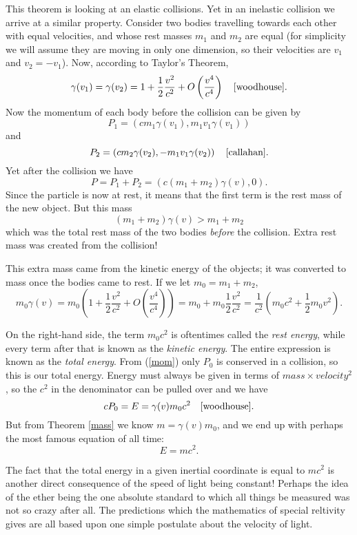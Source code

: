 \documentclass[12pt]{article}
\theoremstyle{defn}
\theoremstyle{pf}
\newcommand{\0}{\emptyset}
\renewcommand{\-}{\setminus}
\begin{document}
This theorem is looking at an elastic collisions. Yet in an inelastic collision we arrive at a similar property. Consider two bodies travelling towards each other with equal velocities, and whose rest masses $m_1$ and $m_2$ are equal (for simplicity we will assume they are moving in only one dimension, so their velocities are $v_1$ and $v_2=-v_1$). Now, according to Taylor's Theorem, $$\gamma(v_1)=\gamma(v_2)=1+\dfrac{1}{2}\dfrac{v^2}{c^2}+O\left(\dfrac{v^4}{c^4}\right)  \quad \mbox{\cite{woodhouse}}.$$ Now the momentum of each body before the collision can be given by $$P_1=\left(cm_1\gamma(v_1),m_1v_1\gamma(v_1)\right)$$ and $$P_2=\left(cm_2\gamma(v_2),-m_1v_1\gamma(v_2)\right) \quad \mbox{\cite{callahan}}.$$ Yet after the collision we have \begin{equation}\label{mom}P=P_1+P_2=\left(c(m_1+m_2)\gamma(v),0\right).\end{equation} Since the particle is now at rest, it means that the first term is the rest mass of the new object. But this mass $$(m_1+m_2)\gamma(v)>m_1+m_2$$ which was the total rest mass of the two bodies \textit{before} the collision. Extra rest mass was created from the collision! 

This extra mass came from the kinetic energy of the objects; it was converted to mass once the bodies came to rest. If we let $m_0=m_1+m_2$,  $$m_0\gamma(v)=m_0\left(1+\dfrac{1}{2}\dfrac{v^2}{c^2}+O\left(\dfrac{v^4}{c^4}\right)\right)=m_0+m_0\dfrac{1}{2}\dfrac{v^2}{c^2}=\dfrac{1}{c^2}\left(m_0c^2+\dfrac{1}{2}m_0v^2\right).$$
 
On the right-hand side, the term $m_0c^2$ is oftentimes called the \textit{rest energy}, while every term after that is known as the \textit{kinetic energy}. The entire expression is known as the \textit{total energy}. From (\ref{mom}) only $P_0$ is conserved in a collision, so this is our total energy. Energy must always be given in terms of $mass\times velocity^2$, so the $c^2$ in the denominator can be pulled over and we have $$cP_0=E=\gamma(v)m_0c^2 \quad \mbox{\cite{woodhouse}}.$$ But from Theorem \ref{mass} we know $m=\gamma(v)m_0$, and we end up with perhaps the most famous equation of all time: $$E=mc^2.$$

The fact that the total energy in a given inertial coordinate is equal to $mc^2$ is another direct consequence of the speed of light being constant! Perhaps the idea of the ether being the one absolute standard to which all things be measured was not so crazy after all. The predictions which the mathematics of special reltivity gives are all based upon one simple postulate about the velocity of light.
\end{document}

